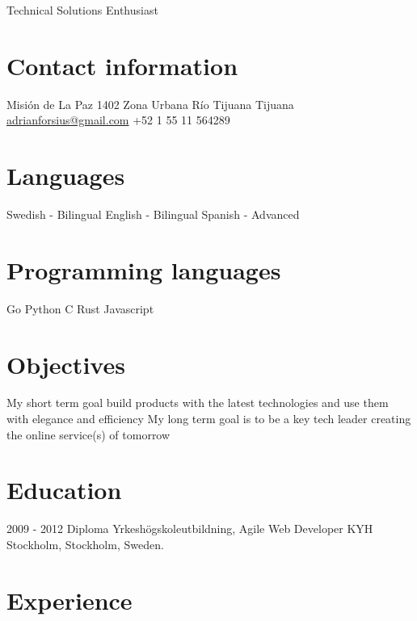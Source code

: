 \documentclass[]{friggeri-cv}
\begin{document}
       {Technical Solutions Enthusiast}

\begin{aside}
  \section{Contact information}
    Misión de La Paz 1402
    Zona Urbana Río Tijuana
    Tijuana
    ~
    \href{mailto:adrianforsius@gmail.com}{adrianforsius@gmail.com}
    +52 1 55 11 564289
  \section{Languages}
    Swedish - Bilingual
    English - Bilingual
    Spanish - Advanced
  \section{Programming languages}
    Go
    Python
    C
    Rust
    Javascript
\end{aside}

\section{Objectives}
    My short term goal build products with the latest technologies and use them with elegance and efficiency
    My long term goal is to be a key tech leader creating the online service(s) of tomorrow

\section{Education}

\begin{entrylist}
  \entry
    {2009 - 2012}
    {Diploma Yrkeshögskoleutbildning, Agile Web Developer}
    {}
    {KYH Stockholm, Stockholm, Sweden.}
\end{entrylist}

\section{Experience}
\end{document}

